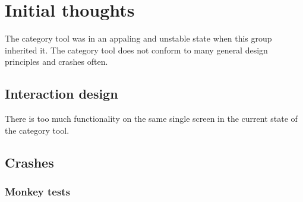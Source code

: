 \section{Initial thoughts}

The category tool was in an appaling and unstable state when this group inherited it. The category tool does not conform to many general design principles and crashes often.

\subsection{Interaction design}

There is too much functionality on the same single screen in the current state of the category tool. 


\subsection{Crashes}

\subsubsection{Monkey tests}